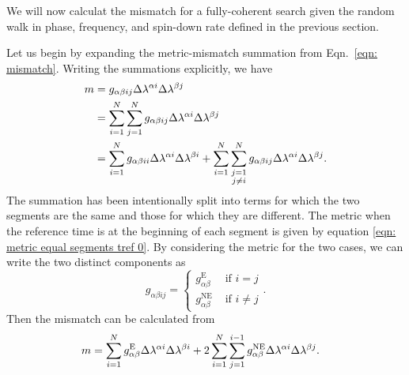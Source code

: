 We will now calculat the mismatch for a fully-coherent search given the
random walk in phase, frequency, and spin-down rate defined in the previous
section.

Let us begin by expanding the metric-mismatch summation from Eqn.~\eqref{eqn:
mismatch}.  Writing the summations explicitly, we have
\begin{align}
m & = g_{\alpha\beta i j}\Delta\lambda^{\alpha i}\Delta\lambda^{\beta j}  \\
&=\sum_{i=1}^{N}\sum_{j=1}^{N}g_{\alpha\beta i j}\Delta\lambda^{\alpha i}\Delta\lambda^{\beta j}  \\
&= \sum_{i=1}^{N}g_{\alpha\beta i i}\Delta\lambda^{\alpha i}\Delta\lambda^{\beta i}
+ \sum_{i=1}^{N} \sum_{\substack{j=1\\ j \ne i}}^{N} g_{\alpha \beta ij}\Delta\lambda^{\alpha i}\Delta\lambda^{\beta j}.
\end{align}
The summation has been intentionally split into terms for which the two
segments are the same and those for which they are different. The metric when
the reference time is at the beginning of each segment is given by equation
\eqref{eqn: metric equal segments tref 0}. By considering the metric for the
two cases, we can write the two distinct components as
\begin{equation}
g_{\alpha\beta ij} = \left\{
\begin{array}{cc}
g_{\alpha\beta}^{\mathrm{E}} & \textrm{ if } i =j \\
g_{\alpha\beta}^{\mathrm{NE}} & \textrm{ if } i  \ne j
\end{array}\right.  .
\end{equation}
Then the mismatch can be calculated from
\begin{align}
m &= \sum_{i=1}^{N}g_{\alpha\beta}^{\mathrm{E}}\Delta\lambda^{\alpha i}\Delta\lambda^{\beta i}
+ 2\sum_{i=1}^{N} \sum_{j=1}^{i-1} g_{\alpha \beta}^{\mathrm{NE}}\Delta\lambda^{\alpha i}\Delta\lambda^{\beta j} .
\label{eqn: mismatch sep}
\end{align}

